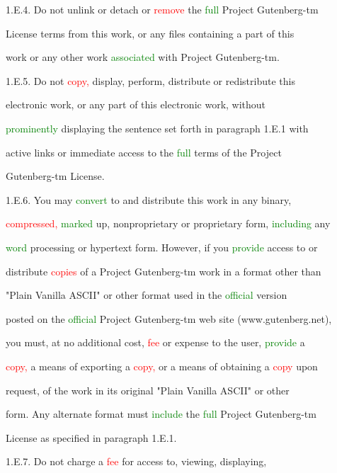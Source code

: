  1.E.4. Do not unlink or detach or \textcolor{red}{remove} the \textcolor{green}{full} Project Gutenberg-tm

 License terms from this work, or any files containing a part of this

 work or any other work \textcolor{green}{associated} with Project Gutenberg-tm.



 1.E.5. Do not \textcolor{red}{copy,} display, perform, distribute or redistribute this

 electronic work, or any part of this electronic work, without

 \textcolor{green}{prominently} displaying the \textcolor{BurntOrange}{sentence} set forth in paragraph 1.E.1 with

 active links or immediate access to the \textcolor{green}{full} terms of the Project

 Gutenberg-tm License.



 1.E.6. You may \textcolor{green}{convert} to and distribute this work in any binary,

 \textcolor{red}{compressed,} \textcolor{green}{marked} up, nonproprietary or proprietary form, \textcolor{green}{including} any

 \textcolor{green}{word} processing or hypertext form. However, if you \textcolor{green}{provide} access to or

 distribute \textcolor{red}{copies} of a Project Gutenberg-tm work in a format other than

 "Plain Vanilla ASCII" or other format used in the \textcolor{green}{official} version

 posted on the \textcolor{green}{official} Project Gutenberg-tm web site (www.gutenberg.net),

 you must, at no additional cost, \textcolor{red}{fee} or expense to the user, \textcolor{green}{provide} a

 \textcolor{red}{copy,} a means of exporting a \textcolor{red}{copy,} or a means of obtaining a \textcolor{red}{copy} upon

 request, of the work in its original "Plain Vanilla ASCII" or other

 form. Any alternate format must \textcolor{green}{include} the \textcolor{green}{full} Project Gutenberg-tm

 License as specified in paragraph 1.E.1.



 1.E.7. Do not charge a \textcolor{red}{fee} for access to, viewing, displaying,

